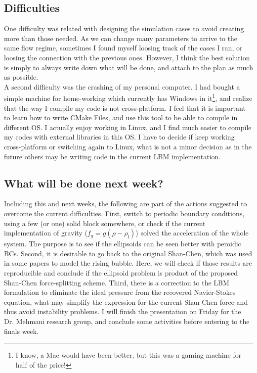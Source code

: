 \documentclass[12pt]{article}
\begin{document}
	\subsection*{Difficulties}
	One difficulty was related with designing the simulation cases to avoid creating more than those needed. As we can change many parameters to arrive to the same flow regime, sometimes I found myself loosing track of the cases I ran, or loosing the connection with the previous ones. However, I think the best solution is simply to always write down what will be done, and attach to the plan as much as possible.\\
	
	A second difficulty was the crashing of my personal computer. I had bought a simple machine for home-working which currently has Windows in it\footnote{I know, a Mac would have been better, but this was a gaming machine for half of the price!}, and realize that the way I compile my code is not cross-platform. I feel that it is important to learn how to write CMake Files, and use this tool to be able to compile in different OS. I actually enjoy working in Linux, and I find much easier to compile my codes with external libraries in this OS. I have to decide if keep working cross-platform or switching again to Linux, what is not a minor decision as in the future others may be writing code in the current LBM implementation. 
	
	\subsection*{What will be done next week?}
	Including this and next weeks, the following are part of the actions suggested to overcome the current difficulties. First, switch to periodic boundary conditions, using a few (or one) solid block somewhere, or check if the current implementation of gravity ($f_g = g (\rho - \rho_l)$) solved the acceleration of the whole system. The purpose is to see if the ellipsoids can be seen better with peroidic BCs. Second, it is desirable to go back to the original Shan-Chen, which was used in some papers to model the rising bubble. Here, we will check if those results are reproducible and conclude if the ellipsoid problem is product of the proposed Shan-Chen force-splitting scheme. Third, there is a correction to the LBM formulation to eliminate the ideal pressure from the recovered Navier-Stokes equation, what may simplify the expression for the current Shan-Chen force and thus avoid instability problems. I will finish the presentation on Friday for the Dr. Mehmani research group, and conclude some activities before entering to the finals week.
	
	\printbibliography %
\end{document}
